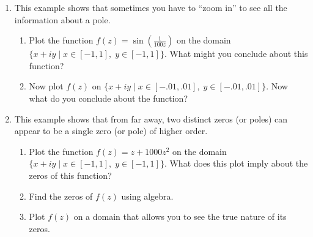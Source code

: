 \begin{problem}\label{prob:caution}
\leavevmode
\begin{enumerate}
\item This example shows that sometimes you have to ``zoom in'' to see all the information about a pole.
\begin{enumerate}
\item Plot the function $f(z) =\sin( \frac{1}{100z})$ on the domain $\{x+iy \mid x \in [-1,1],\; y \in [-1,1]\}$.
What might you conclude about this function?
\item Now plot $f(z)$ on $\{x+iy \mid x \in [-.01,.01], \; y \in [-.01,.01]\}$.
Now what do you conclude about the function?
\end{enumerate}
\item This example shows that from far away, two distinct zeros (or poles) can appear to be a single zero (or pole) of higher order.
\begin{enumerate}
\item Plot the function $f(z) = z+1000z^2$ on the domain $\{x+iy \mid x \in [-1,1], \; y \in [-1,1]\}$.
What does this plot imply about the zeros of this function?
\item Find the zeros of $f(z)$ using algebra.
\item Plot $f(z)$ on a domain that allows you to see the true nature of its zeros.
\end{enumerate}
\end{enumerate}
\end{problem}





















